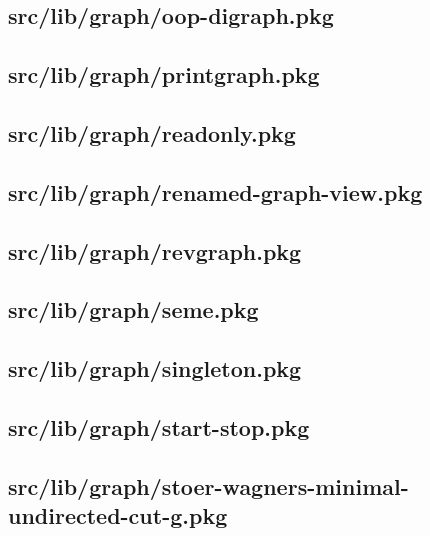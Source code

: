 \subsection{src/lib/graph/oop-digraph.pkg}


\subsection{src/lib/graph/printgraph.pkg}


\subsection{src/lib/graph/readonly.pkg}


\subsection{src/lib/graph/renamed-graph-view.pkg}


\subsection{src/lib/graph/revgraph.pkg}


\subsection{src/lib/graph/seme.pkg}


\subsection{src/lib/graph/singleton.pkg}


\subsection{src/lib/graph/start-stop.pkg}


\subsection{src/lib/graph/stoer-wagners-minimal-undirected-cut-g.pkg}


